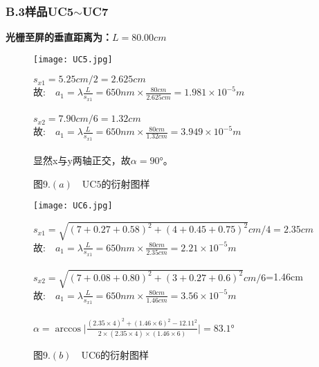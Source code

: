 \documentclass{ctexart}
\begin{document}
\subsubsection*{B.3\quad 样品UC5$\sim$UC7}
\noindent \textbf{光栅至屏的垂直距离为：$L=80.00cm$}
\begin{figure}[H]
  \begin{minipage}[c]{0.45\linewidth}
    \texttt{[image: UC5.jpg]}
    \caption*{图$9.(a)\quad \mathrm{UC5}$的衍射图样}
    \end{minipage}
    \hspace{1cm}
    \begin{minipage}[c]{0.8\linewidth}
    $s_{x1}=5.25cm/2=2.625cm$\\
    故:$\quad a_1=\lambda\frac{L}{s_{x1}}=650nm\times \frac{80cm}{2.625cm}=1.981\times 10^{-5}m$\\
    \noindent \\
    $s_{x2}=7.90cm/6=1.32cm$\\
    故:$\quad a_1=\lambda\frac{L}{s_{x1}}=650nm\times \frac{80cm}{1.32cm}=3.949\times 10^{-5}m$\\
    \noindent \\
    显然x与y两轴正交，故$\alpha=90°$。
    \end{minipage}
\end{figure}
\begin{figure}[H]
  \begin{minipage}[c]{0.45\linewidth}
    \texttt{[image: UC6.jpg]}
    \caption*{图$9.(b)\quad \mathrm{UC6}$的衍射图样}
    \end{minipage}
    \hspace{1cm}
    \begin{minipage}[c]{0.8\linewidth}
    $s_{x1}=\sqrt{(7+0.27+0.58)^2+(4+0.45+0.75)^2}cm/4=2.35cm$\\
    故:$\quad a_1=\lambda\frac{L}{s_{x1}}=650nm\times \frac{80cm}{2.35cm}=2.21\times 10^{-5}m$\\
    \noindent \\
    $s_{x2}=\sqrt{(7+0.08+0.80)^2+(3+0.27+0.6)^2}cm/6$=1.46cm\\
    故:$\quad a_1=\lambda\frac{L}{s_{x1}}=650nm\times \frac{80cm}{1.46cm}=3.56\times 10^{-5}m$\\
    \noindent \\
    $\alpha=\arccos\Big|\frac{(2.35\times 4)^2+(1.46\times 6)^2-12.11^2}{2\times (2.35\times 4) \times (1.46 \times 6) }\Big|=83.1°$
    \end{minipage}
\end{figure}
\end{document}
